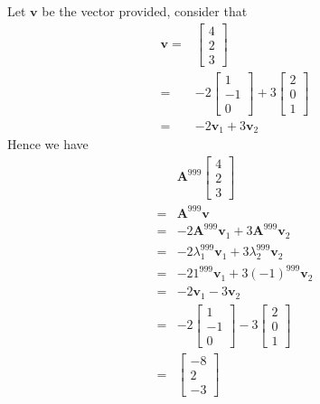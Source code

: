 \documentclass[12pt]{article}
\newcommand{\matr}[1]{\bm{#1}}
\newenvironment{answer}[2][Answer]{\begin{trivlist}
    \item[\hskip \labelsep {\bfseries #1}\hskip \labelsep {\bfseries #2.}]}{\end{trivlist}}
\begin{document}
\begin{answer}{Q. 2}\end{answer}
Let $\matr v$ be the vector provided, consider that
\begin{align}
    \matr v =& \begin{bmatrix}
    4 \\ 2 \\3
    \end{bmatrix} \\
    =& -2 \begin{bmatrix}
    1 \\ -1 \\ 0
    \end{bmatrix}
    +3 \begin{bmatrix}
    2 \\ 0 \\ 1
    \end{bmatrix} \\
    =& -2 \matr v_1 + 3 \matr v_2
\end{align}
Hence we have
\begin{align}
   & \matr A ^{999} \begin{bmatrix}
    4 \\ 2 \\3
    \end{bmatrix} \\
    =& \matr A^ {999} \matr v \\
    =&-2\matr A ^{999} \matr v_1 + 3 \matr A^{999} \matr v_2 \\
    =& -2 \lambda _1 ^{999}\matr v _1 + 3 \lambda _2^{999} \matr v_2 \\
    =& -2 1 ^{999}\matr v _1 + 3 (-1)^{999} \matr v_2 \\
    =& -2 \matr v _1 -3 \matr v _2 \\
    =& -2 \begin{bmatrix}
    1 \\ -1 \\ 0
    \end{bmatrix} -3 \begin{bmatrix}
    2 \\ 0 \\1
    \end{bmatrix} \\
    =&\begin{bmatrix}
    -8 \\ 2 \\ -3
    \end{bmatrix}
\end{align}
\end{document}
